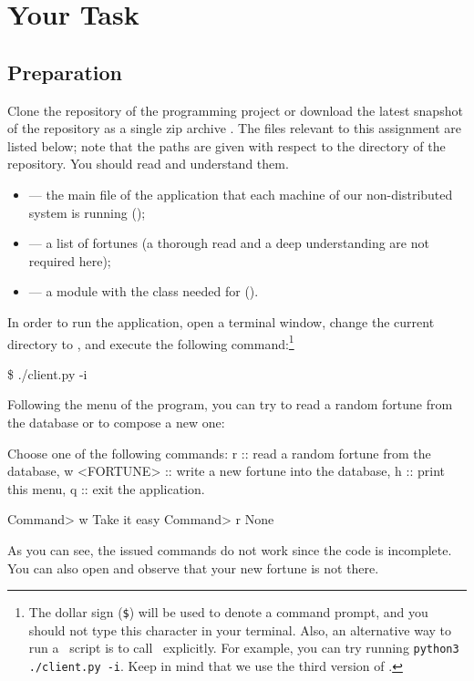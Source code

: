 \documentclass[a4paper,10pt]{article}
\begin{document}
\section{Your Task}
\subsection{Preparation} 
Clone the repository of the programming project or download the latest snapshot
of the repository as a single zip archive \cite{repository}. The files relevant
to this assignment are listed below; note that the paths are given with respect
to the  directory of the repository. You should read and
understand them.
\begin{itemize}

  \item {} --- the main file of the application that each
  machine of our non-distributed system is running (\leave);

  \item {} --- a list of fortunes (a thorough read
  and a deep understanding are not required here);

  \item {} --- a module with the
   class needed for  (\fix).

\end{itemize}

In order to run the application, open a terminal window, change the current
directory to , and execute the following command:\footnote{The
dollar sign (\texttt{\$}) will be used to denote a command prompt, and you
should not type this character in your terminal. Also, an alternative way to run
a \python\ script is to call \python\ explicitly. For example, you can try
running \texttt{python3 ./client.py -i}. Keep in mind that we use the third
version of \python.}

\begin{shell}
\$ ./client.py -i
\end{shell}
Following the menu of the program, you can try to read a random fortune from the
database or to compose a new one:
\begin{shell}
Choose one of the following commands:
    r            ::  read a random fortune from the database,
    w <FORTUNE>  ::  write a new fortune into the database,
    h            ::  print this menu,
    q            ::  exit the application.

Command> w Take it easy
Command> r
None
\end{shell}
As you can see, the issued commands do not work since the code is incomplete.
You can also open  and observe that your new fortune is not
there.
\end{document}
